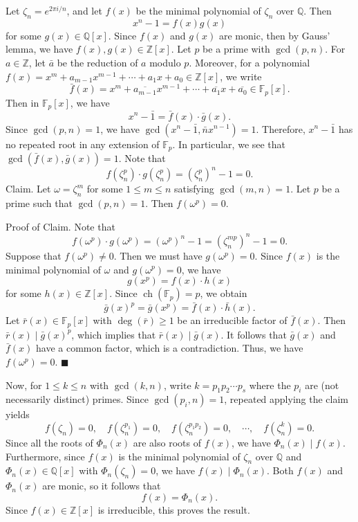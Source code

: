 \documentclass[10pt]{article}
\makeatletter
\newcommand{\Z}{\mathbb{Z}}
\newcommand{\Q}{\mathbb{Q}}
\newcommand{\F}{\mathbb{F}}
\DeclareMathOperator{\ch}{ch}
\theoremstyle{newstyle}
\newenvironment{pf}[1][\proofname]{\par
  \pushQED{\qed}%
  \normalfont \topsep0\p@\relax
  \trivlist
  \item[\hskip\labelsep\scshape
  #1\@addpunct{.}]\ignorespaces
}{%
  \popQED\endtrivlist\@endpefalse
}
\makeatother
\begin{document}
\begin{pf}
Let $\zeta_n = e^{2\pi i/n}$, and let $f(x)$ be the minimal polynomial of $\zeta_n$ over $\Q$. 
Then 
\[ x^n - 1 = f(x)g(x) \]
for some $g(x) \in \Q[x]$. Since $f(x)$ and $g(x)$ are monic, then by Gauss' lemma, we have 
$f(x), g(x) \in \Z[x]$. Let $p$ be a prime with $\gcd(p, n)$. For $a \in \Z$, let $\bar a$ be the 
reduction of $a$ modulo $p$. Moreover, for a polynomial $f(x) = x^m + a_{m-1} x^{m-1} + 
\cdots + a_1x + a_0 \in \Z[x]$, we write 
\[ \bar{f}(x) = x^m + \overline{a_{m-1}} x^{m-1} + \cdots + \overline{a_1} x + \overline{a_0} \in 
\F_p[x]. \] 
Then in $\F_p[x]$, we have 
\[ x^n - \bar1 = \bar f(x) \cdot \bar g(x). \]
Since $\gcd(p, n) = 1$, we have $\gcd(x^n - \bar1, \bar nx^{n-1}) = 1$. Therefore, 
$x^n - \bar1$ has no repeated root in any extension of $\F_p$. In particular, we see that 
$\gcd(\bar f(x), \bar g(x)) = 1$. Note that 
\[ f(\zeta_n^p) \cdot g(\zeta_n^p) = (\zeta_n^p)^n - 1 = 0. \] 
{\sc Claim.} Let $\omega = \zeta_n^m$ for some $1 \leq m \leq n$ satisfying $\gcd(m, n) = 1$. 
Let $p$ be a prime such that $\gcd(p, n) = 1$. Then $f(\omega^p) = 0$. 

{\sc Proof of Claim.} Note that 
\[ f(\omega^p) \cdot g(\omega^p) = (\omega^p)^n - 1 = (\zeta_n^{mp})^n - 1 = 0. \]
Suppose that $f(\omega^p) \neq 0$. Then we must have $g(\omega^p) = 0$. Since $f(x)$ is the 
minimal polynomial of $\omega$ and $g(\omega^p) = 0$, we have 
\[ g(x^p) = f(x) \cdot h(x) \]
for some $h(x) \in \Z[x]$. Since $\ch(\F_p) = p$, we obtain 
\[ \bar g(x)^p = \bar g(x^p) = \bar f(x) \cdot \bar h(x). \]
Let $\bar r(x) \in \F_p[x]$ with $\deg(\bar r) \geq 1$ be an irreducible factor of $\bar f(x)$. 
Then $\bar r(x) \mid \bar g(x)^p$, which implies that $\bar r(x) \mid \bar g(x)$. It follows that 
$\bar g(x)$ and $\bar f(x)$ have a common factor, which is a contradiction. Thus, we have 
$f(\omega^p) = 0$. \hfill $\blacksquare$

Now, for $1 \leq k \leq n$ with $\gcd(k, n)$, write $k = p_1p_2 \cdots p_s$ where the $p_i$ are 
(not necessarily distinct) primes. Since $\gcd(p_i, n) = 1$, repeated applying the claim yields 
\[ f(\zeta_n) = 0, \quad f(\zeta_n^{p_1}) = 0, \quad f(\zeta_n^{p_1p_2}) = 0, \quad \cdots, 
\quad f(\zeta_n^k) = 0. \]
Since all the roots of $\Phi_n(x)$ are also roots of $f(x)$, we have $\Phi_n(x) \mid f(x)$. 
Furthermore, since $f(x)$ is the minimal polynomial of $\zeta_n$ over $\Q$ and 
$\Phi_n(x) \in \Q[x]$ with $\Phi_n(\zeta_n) = 0$, we have $f(x) \mid \Phi_n(x)$. 
Both $f(x)$ and $\Phi_n(x)$ are monic, so it follows that 
\[ f(x) = \Phi_n(x). \]
Since $f(x) \in \Z[x]$ is irreducible, this proves the result. 
\end{pf}
\end{document}
